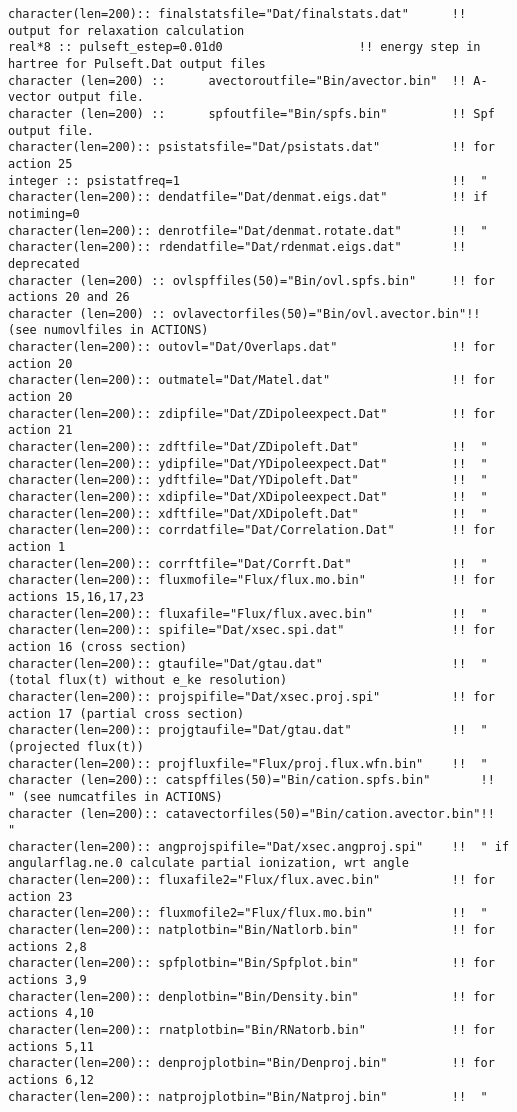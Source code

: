 \begin{verbatim}
character(len=200):: finalstatsfile="Dat/finalstats.dat"      !! output for relaxation calculation
real*8 :: pulseft_estep=0.01d0                   !! energy step in hartree for Pulseft.Dat output files
character (len=200) ::      avectoroutfile="Bin/avector.bin"  !! A-vector output file.        
character (len=200) ::      spfoutfile="Bin/spfs.bin"         !! Spf output file.
character(len=200):: psistatsfile="Dat/psistats.dat"          !! for action 25
integer :: psistatfreq=1                                      !!  "
character(len=200):: dendatfile="Dat/denmat.eigs.dat"         !! if notiming=0
character(len=200):: denrotfile="Dat/denmat.rotate.dat"       !!  "
character(len=200):: rdendatfile="Dat/rdenmat.eigs.dat"       !! deprecated
character (len=200) :: ovlspffiles(50)="Bin/ovl.spfs.bin"     !! for actions 20 and 26 
character (len=200) :: ovlavectorfiles(50)="Bin/ovl.avector.bin"!!      (see numovlfiles in ACTIONS)
character(len=200):: outovl="Dat/Overlaps.dat"                !! for action 20
character(len=200):: outmatel="Dat/Matel.dat"                 !! for action 20
character(len=200):: zdipfile="Dat/ZDipoleexpect.Dat"         !! for action 21
character(len=200):: zdftfile="Dat/ZDipoleft.Dat"             !!  "
character(len=200):: ydipfile="Dat/YDipoleexpect.Dat"         !!  "
character(len=200):: ydftfile="Dat/YDipoleft.Dat"             !!  "
character(len=200):: xdipfile="Dat/XDipoleexpect.Dat"         !!  "
character(len=200):: xdftfile="Dat/XDipoleft.Dat"             !!  "
character(len=200):: corrdatfile="Dat/Correlation.Dat"        !! for action 1
character(len=200):: corrftfile="Dat/Corrft.Dat"              !!  "
character(len=200):: fluxmofile="Flux/flux.mo.bin"            !! for actions 15,16,17,23
character(len=200):: fluxafile="Flux/flux.avec.bin"           !!  "
character(len=200):: spifile="Dat/xsec.spi.dat"               !! for action 16 (cross section)
character(len=200):: gtaufile="Dat/gtau.dat"                  !!  " (total flux(t) without e_ke resolution)
character(len=200):: projspifile="Dat/xsec.proj.spi"          !! for action 17 (partial cross section)
character(len=200):: projgtaufile="Dat/gtau.dat"              !!  " (projected flux(t))
character(len=200):: projfluxfile="Flux/proj.flux.wfn.bin"    !!  "
character (len=200):: catspffiles(50)="Bin/cation.spfs.bin"       !!  " (see numcatfiles in ACTIONS)
character (len=200):: catavectorfiles(50)="Bin/cation.avector.bin"!!  "
character(len=200):: angprojspifile="Dat/xsec.angproj.spi"    !!  " if angularflag.ne.0 calculate partial ionization, wrt angle
character(len=200):: fluxafile2="Flux/flux.avec.bin"          !! for action 23
character(len=200):: fluxmofile2="Flux/flux.mo.bin"           !!  "
character(len=200):: natplotbin="Bin/Natlorb.bin"             !! for actions 2,8
character(len=200):: spfplotbin="Bin/Spfplot.bin"             !! for actions 3,9
character(len=200):: denplotbin="Bin/Density.bin"             !! for actions 4,10
character(len=200):: rnatplotbin="Bin/RNatorb.bin"            !! for actions 5,11
character(len=200):: denprojplotbin="Bin/Denproj.bin"         !! for actions 6,12
character(len=200):: natprojplotbin="Bin/Natproj.bin"         !!  "
\end{verbatim} 
